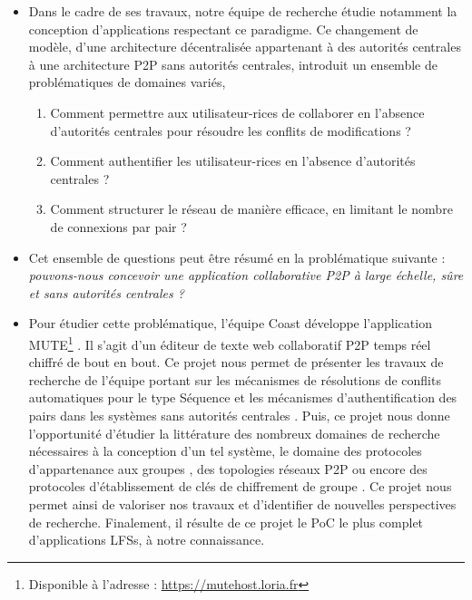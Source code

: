 \begin{itemize}
    \item Dans le cadre de ses travaux, notre équipe de recherche étudie notamment la conception d'applications respectant ce paradigme.
        Ce changement de modèle, d'une architecture décentralisée appartenant à des autorités centrales à une architecture \ac{P2P} sans autorités centrales, introduit un ensemble de problématiques de domaines variés, \eg
        \begin{enumerate}
            \item Comment permettre aux utilisateur-rices de collaborer en l'absence d'autorités centrales pour résoudre les conflits de modifications ?
            \item Comment authentifier les utilisateur-rices en l'absence d'autorités centrales ?
            \item Comment structurer le réseau de manière efficace, \ie en limitant le nombre de connexions par pair ?
        \end{enumerate}
    \item Cet ensemble de questions peut être résumé en la problématique suivante : \emph{pouvons-nous concevoir une application collaborative \ac{P2P} à large échelle, sûre et sans autorités centrales ?}
    \item Pour étudier cette problématique, l'équipe Coast développe l'application \acf{MUTE}\footnote{Disponible à l'adresse : \url{https://mutehost.loria.fr}} \cite{MUTE2017}.
        Il s'agit d'un éditeur de texte web collaboratif \ac{P2P} temps réel chiffré de bout en bout.
        Ce projet nous permet de présenter les travaux de recherche de l'équipe portant sur les mécanismes de résolutions de conflits automatiques pour le type Séquence \cite{2013-logootsplit,2021-these-vic,2022-rls-tpds-nicolas} et les mécanismes d'authentification des pairs dans les systèmes sans autorités centrales \cite{2018-trusternity-short,2018-trusternity-long}.
        Puis, ce projet nous donne l'opportunité d'étudier la littérature des nombreux domaines de recherche nécessaires à la conception d'un tel système, \ie le domaine des protocoles d'appartenance aux groupes \cite{swim2002, lifeguard2018}, des topologies réseaux \ac{P2P} \cite{2018-spray-nedelec} ou encore des protocoles d'établissement de clés de chiffrement de groupe \cite{1995-burmester-desmedt}.
        Ce projet nous permet ainsi de valoriser nos travaux et d'identifier de nouvelles perspectives de recherche.
        Finalement, il résulte de ce projet le \acf{PoC} le plus complet d'applications \acp{LFS}, à notre connaissance.
\end{itemize}
